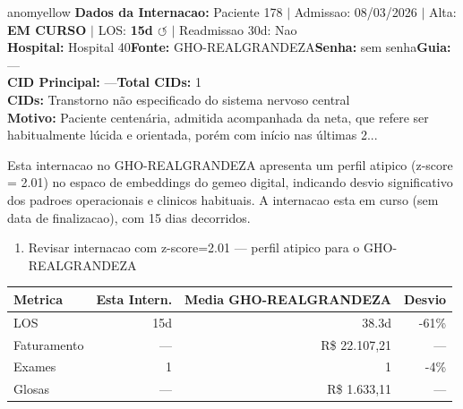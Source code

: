 \documentclass[a4paper,10pt]{article}
\begin{document}
\begin{anomalycard}[Internacao 12208 | GHO-REALGRANDEZA | MODERADO (z=2.01)]{anomyellow}
\textbf{Dados da Internacao:} Paciente 178 $\mid$ Admissao: 08/03/2026 $\mid$ Alta: \textcolor{anomorange}{\textbf{EM CURSO}} $\mid$ LOS: \textbf{15d \textcolor{anomorange}{$\circlearrowleft$}} $\mid$ Readmissao 30d: Nao\\
\textbf{Hospital:} Hospital 40\quad\textbf{Fonte:} GHO-REALGRANDEZA\quad\textbf{Senha:} sem senha\quad\textbf{Guia:} ---\\
\textbf{CID Principal:} {\small ---}\quad\textbf{Total CIDs:} 1\\

\textbf{CIDs:} {\scriptsize Transtorno não especificado do sistema nervoso central}\\

\textbf{Motivo:} {\scriptsize Paciente centenária, admitida acompanhada da neta, que refere ser habitualmente lúcida e orientada, porém com início nas últimas 2...}\\

\vspace{2pt}\begin{tcolorbox}[colback=severityred!20,colframe=anomyellow,title={\textbf{Interpretacao de Negocio}},fonttitle=\bfseries\small,left=4pt,right=4pt,top=3pt,bottom=3pt]
{\small Esta internacao no GHO-REALGRANDEZA apresenta um perfil atipico (z-score = 2.01) no espaco de embeddings do gemeo digital, indicando desvio significativo dos padroes operacionais e clinicos habituais. A internacao esta em curso (sem data de finalizacao), com 15 dias decorridos.}
\end{tcolorbox}
\begin{tcolorbox}[colback=severityyellow!30,colframe=anomorange,title={\textbf{Recomendacoes Especificas}},fonttitle=\bfseries\small,left=4pt,right=4pt,top=3pt,bottom=3pt]
\begin{enumerate}[nosep,leftmargin=16pt]
\item {\small Revisar internacao com z-score=2.01 --- perfil atipico para o GHO-REALGRANDEZA}
\end{enumerate}
\end{tcolorbox}
\begin{center}\begin{tabular}{l r r r}\toprule\textbf{Metrica} & \textbf{Esta Intern.} & \textbf{Media GHO-REALGRANDEZA} & \textbf{Desvio} \\\midrule
LOS & 15d & 38.3d & -61\% \\
Faturamento & --- & R\$ 22.107,21 & --- \\
Exames & 1 & 1 & -4\% \\
Glosas & --- & R\$ 1.633,11 & --- \\
\bottomrule\end{tabular}\end{center}


\end{anomalycard}
\end{document}
